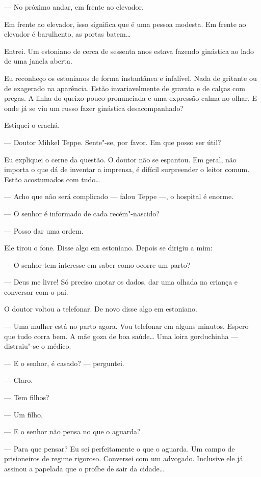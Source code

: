 --- No próximo andar, em frente ao elevador.

Em frente ao elevador, isso significa que é uma pessoa modesta. Em
frente ao elevador é barulhento, as portas batem\ldots{}

Entrei. Um estoniano de cerca de sessenta anos estava fazendo ginástica
ao lado de uma janela aberta.

Eu reconheço os estonianos de forma instantânea e infalível. Nada de
gritante ou de exagerado na aparência. Estão invariavelmente de gravata
e de calças com pregas. A linha do queixo pouco pronunciada e uma
expressão calma no olhar. E onde já se viu um russo fazer ginástica
desacompanhado?

Estiquei o crachá.

--- Doutor Mihkel Teppe. Sente"-se, por favor. Em que posso ser útil?

Eu expliquei o cerne da questão. O doutor não se espantou. Em geral, não
importa o que dá de inventar a imprensa, é difícil surpreender o leitor
comum. Estão acostumados com tudo\ldots{}

--- Acho que não será complicado --- falou Teppe ---, o hospital é
enorme.

--- O senhor é informado de cada recém"-nascido?

--- Posso dar uma ordem.

Ele tirou o fone. Disse algo em estoniano. Depois se dirigiu a mim:

--- O senhor tem interesse em saber como ocorre um parto?

--- Deus me livre! Só preciso anotar os dados, dar uma olhada na criança
e conversar com o pai.

O doutor voltou a telefonar. De novo disse algo em estoniano.

--- Uma mulher está no parto agora. Vou telefonar em alguns minutos.
Espero que tudo corra bem. A mãe goza de boa saúde\ldots{} Uma loira
gorduchinha --- distraiu"-se o médico.

--- E o senhor, é casado? --- perguntei.

--- Claro.

--- Tem filhos?

--- Um filho.

--- E o senhor não pensa no que o aguarda?

--- Para que pensar? Eu sei perfeitamente o que o aguarda. Um campo de
prisioneiros de regime rigoroso. Conversei com um advogado. Inclusive
ele já assinou a papelada que o proíbe de sair da cidade\ldots{}

